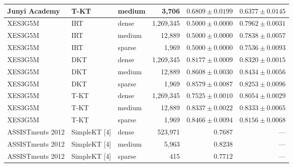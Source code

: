 \begin{table}[htbp]
{\begin{tabular}{lllrrr}
Junyi Academy & T-KT & medium & 3,706 & $0.6809\pm0.0199$ & $0.6377\pm0.0145$ \\
\midrule
XES3G5M & IRT & dense & 1,269,345 & $0.5000\pm0.0000$ & $0.7962\pm0.0031$ \\
XES3G5M & IRT & medium & 12,889 & $0.5000\pm0.0000$ & $0.7838\pm0.0057$ \\
XES3G5M & IRT & sparse & 1,969 & $0.5000\pm0.0000$ & $0.7536\pm0.0093$ \\
XES3G5M & DKT & dense & 1,269,345 & $0.8177\pm0.0009$ & $0.8320\pm0.0015$ \\
XES3G5M & DKT & medium & 12,889 & $0.8608\pm0.0030$ & $0.8434\pm0.0056$ \\
XES3G5M & DKT & sparse & 1,969 & $0.8579\pm0.0087$ & $0.8253\pm0.0096$ \\
XES3G5M & T-KT & dense & 1,269,345 & $0.7525\pm0.0010$ & $0.8054\pm0.0029$ \\
XES3G5M & T-KT & medium & 12,889 & $0.8337\pm0.0022$ & $0.8333\pm0.0065$ \\
XES3G5M & T-KT & sparse & 1,969 & $0.8466\pm0.0094$ & $0.8156\pm0.0068$ \\
\midrule
ASSISTments 2012 & SimpleKT [4] & dense & 523,971 & $0.7687$ & — \\
ASSISTments 2012 & SimpleKT [4] & medium & 5,963 & $0.8238$ & — \\
ASSISTments 2012 & SimpleKT [4] & sparse & 415 & $0.7712$ & — \\
\bottomrule
\end{tabular}%
}
\end{table}
